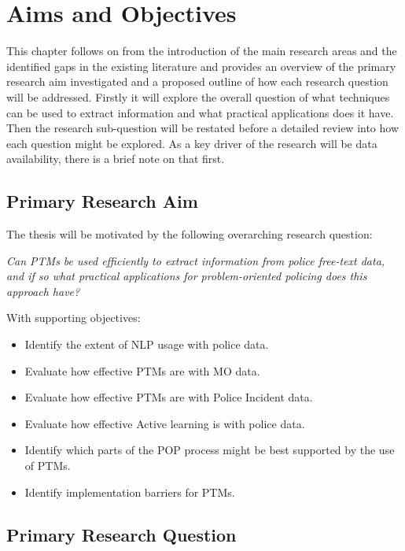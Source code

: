 \chapter{Aims and Objectives} This chapter follows on from the introduction of the main research areas and the identified gaps in the existing literature and provides an overview of the primary research aim investigated and a proposed outline of how each research question will be addressed. Firstly it will explore the overall question of what techniques can be used to extract information and  what practical applications does it have. Then the research sub-question will be restated before a detailed review into how each question might be explored.  As a key driver of the research will be data availability, there is a brief note on that first.

\section{Primary Research Aim}
The thesis will be motivated by the following overarching research question: 

\emph{Can PTMs be used efficiently to extract information from police free-text data, and if so what practical applications for problem-oriented policing does this approach have?}

With supporting objectives:
\begin{itemize}
\item Identify the extent of NLP usage with police data.

\item Evaluate how effective PTMs are with MO data.

\item Evaluate how effective PTMs are with Police Incident data.

\item Evaluate how effective Active learning is with police data.

\item Identify which parts of the POP process might be best supported by the use of PTMs.

\item Identify implementation barriers for PTMs.

\end{itemize}

\section{Primary Research Question}

